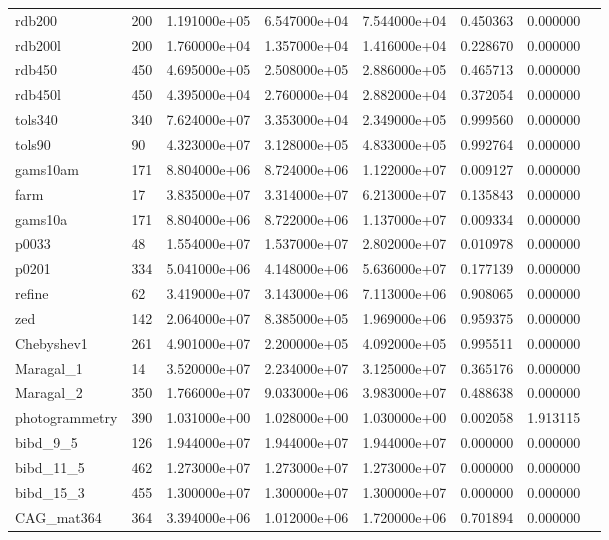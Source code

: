 \begin{tabular}{llrrrrrr}
rdb200                  &  200 &  1.191000e+05 &  6.547000e+04 &  7.544000e+04 &  0.450363 &  0.000000 \\
rdb200l                 &  200 &  1.760000e+04 &  1.357000e+04 &  1.416000e+04 &  0.228670 &  0.000000 \\
rdb450                  &  450 &  4.695000e+05 &  2.508000e+05 &  2.886000e+05 &  0.465713 &  0.000000 \\
rdb450l                 &  450 &  4.395000e+04 &  2.760000e+04 &  2.882000e+04 &  0.372054 &  0.000000 \\
tols340                 &  340 &  7.624000e+07 &  3.353000e+04 &  2.349000e+05 &  0.999560 &  0.000000 \\
tols90                  &   90 &  4.323000e+07 &  3.128000e+05 &  4.833000e+05 &  0.992764 &  0.000000 \\
gams10am                &  171 &  8.804000e+06 &  8.724000e+06 &  1.122000e+07 &  0.009127 &  0.000000 \\
farm                    &   17 &  3.835000e+07 &  3.314000e+07 &  6.213000e+07 &  0.135843 &  0.000000 \\
gams10a                 &  171 &  8.804000e+06 &  8.722000e+06 &  1.137000e+07 &  0.009334 &  0.000000 \\
p0033                   &   48 &  1.554000e+07 &  1.537000e+07 &  2.802000e+07 &  0.010978 &  0.000000 \\
p0201                   &  334 &  5.041000e+06 &  4.148000e+06 &  5.636000e+07 &  0.177139 &  0.000000 \\
refine                  &   62 &  3.419000e+07 &  3.143000e+06 &  7.113000e+06 &  0.908065 &  0.000000 \\
zed                     &  142 &  2.064000e+07 &  8.385000e+05 &  1.969000e+06 &  0.959375 &  0.000000 \\
Chebyshev1              &  261 &  4.901000e+07 &  2.200000e+05 &  4.092000e+05 &  0.995511 &  0.000000 \\
Maragal\_1               &   14 &  3.520000e+07 &  2.234000e+07 &  3.125000e+07 &  0.365176 &  0.000000 \\
Maragal\_2               &  350 &  1.766000e+07 &  9.033000e+06 &  3.983000e+07 &  0.488638 &  0.000000 \\
photogrammetry          &  390 &  1.031000e+00 &  1.028000e+00 &  1.030000e+00 &  0.002058 &  1.913115 \\
bibd\_9\_5                &  126 &  1.944000e+07 &  1.944000e+07 &  1.944000e+07 &  0.000000 &  0.000000 \\
bibd\_11\_5               &  462 &  1.273000e+07 &  1.273000e+07 &  1.273000e+07 &  0.000000 &  0.000000 \\
bibd\_15\_3               &  455 &  1.300000e+07 &  1.300000e+07 &  1.300000e+07 &  0.000000 &  0.000000 \\
CAG\_mat364              &  364 &  3.394000e+06 &  1.012000e+06 &  1.720000e+06 &  0.701894 &  0.000000 \\
\bottomrule
\end{tabular}
